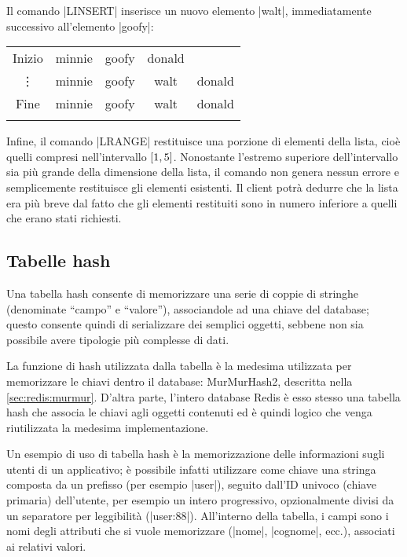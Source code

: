 Il comando \cverb|LINSERT|  inserisce un nuovo elemento \cverb|walt|, im\-me\-dia\-ta\-men\-te
successivo all'elemento \cverb|goofy|:

\begin{center}
	\begin{tabular}{c|*{4}{c|}}
	  \hhline{~---}
	  \scriptsize Inizio & minnie & goofy & donald \\ 
	  \hhline{~----}
	  \vdots             & minnie & goofy & \cellcolor{blue!25}walt & donald \\ 
	  \hhline{~----}
	  \scriptsize Fine   & minnie & goofy & walt & donald \\ 
	  \hhline{~----}
	\end{tabular}
\end{center}

Infine, il comando \cverb|LRANGE|  restituisce una porzione di elementi della lista, cioè
quelli compresi nell'intervallo $\interval{1}{5}$. Nonostante l'estremo superiore dell'intervallo
sia più grande della dimensione della lista, il comando non genera nessun errore e semplicemente
restituisce gli elementi esistenti. Il client potrà dedurre che la lista era più breve dal fatto
che gli elementi restituiti sono in numero inferiore a quelli che erano stati richiesti.

\subsection{Tabelle hash}

Una tabella hash consente di memorizzare una serie di coppie di stringhe (denominate ``campo'' e
``valore''), associandole ad una chiave del database; questo consente quindi di serializzare dei
semplici oggetti, sebbene non sia possibile avere tipologie più complesse di dati.

La funzione di hash utilizzata dalla tabella è la medesima utilizzata per memorizzare le chiavi
dentro il database: MurMurHash2, descritta nella \autoref{sec:redis:murmur}. D'altra parte, l'intero
database Redis è esso stesso una tabella hash che associa le chiavi agli oggetti contenuti ed è
quindi logico che venga riutilizzata la medesima implementazione.

Un esempio di uso di tabella hash è la memorizzazione delle informazioni sugli utenti di un
applicativo; è possibile infatti utilizzare come chiave una stringa composta da un prefisso (per
esempio \cverb|user|), seguito dall'ID univoco (chiave primaria) dell'utente, per esempio un intero
progressivo, opzionalmente divisi da un separatore per leggibilità (\cverb|user:88|). All'interno
della tabella, i campi sono i nomi degli attributi che si vuole memorizzare (\cverb|nome|,
\cverb|cognome|, ecc.), associati ai relativi valori.

